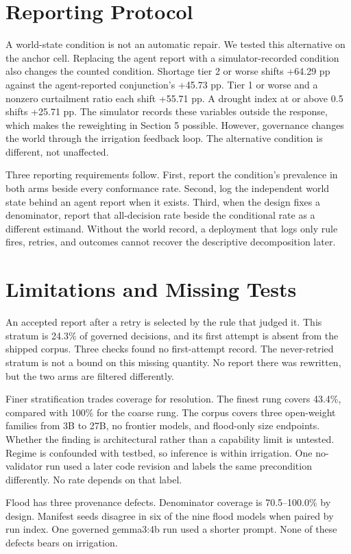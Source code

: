\documentclass{article}
\begin{document}
\section{Reporting Protocol}
A world-state condition is not an automatic repair. We tested this alternative on the anchor cell. Replacing the agent report with a simulator-recorded condition also changes the counted condition. Shortage tier 2 or worse shifts +64.29 pp against the agent-reported conjunction's +45.73 pp. Tier 1 or worse and a nonzero curtailment ratio each shift +55.71 pp. A drought index at or above 0.5 shifts +25.71 pp. The simulator records these variables outside the response, which makes the reweighting in Section 5 possible. However, governance changes the world through the irrigation feedback loop. The alternative condition is different, not unaffected.

Three reporting requirements follow. First, report the condition's prevalence in both arms beside every conformance rate. Second, log the independent world state behind an agent report when it exists. Third, when the design fixes a denominator, report that all-decision rate beside the conditional rate as a different estimand. Without the world record, a deployment that logs only rule fires, retries, and outcomes cannot recover the descriptive decomposition later.

\section{Limitations and Missing Tests}
An accepted report after a retry is selected by the rule that judged it. This stratum is 24.3\% of governed decisions, and its first attempt is absent from the shipped corpus. Three checks found no first-attempt record. The never-retried stratum is not a bound on this missing quantity. No report there was rewritten, but the two arms are filtered differently.

Finer stratification trades coverage for resolution. The finest rung covers 43.4\%, compared with 100\% for the coarse rung. The corpus covers three open-weight families from 3B to 27B, no frontier models, and flood-only size endpoints. Whether the finding is architectural rather than a capability limit is untested. Regime is confounded with testbed, so inference is within irrigation. One no-validator run used a later code revision and labels the same precondition differently. No rate depends on that label.

Flood has three provenance defects. Denominator coverage is 70.5--100.0\% by design. Manifest seeds disagree in six of the nine flood models when paired by run index. One governed gemma3:4b run used a shorter prompt. None of these defects bears on irrigation.
\end{document}
